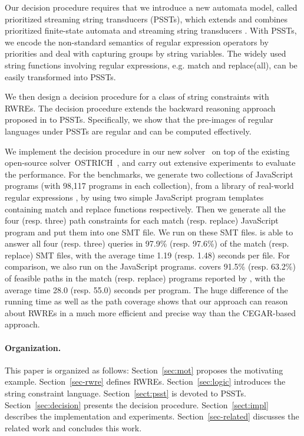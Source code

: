 Our decision procedure requires that we introduce a new automata model, called 
prioritized streaming string transducers (PSSTs), which extends and combines 
prioritized finite-state automata \cite{BM17} and streaming string transducers 
\cite{AC10,AD11}. With PSSTs, we encode the non-standard semantics of regular 
expression operators by priorities and deal with capturing groups by string variables. 
The widely used string functions involving regular expressions, e.g. match and replace(all), can be easily transformed into PSSTs. 

We then design a decision procedure for a class of string constraints with RWREs. The decision procedure extends the backward reasoning approach proposed in \cite{CHL+19} to PSSTs. Specifically, we show that the pre-images of regular languages under PSSTs are regular and can be computed effectively. 

We implement the decision procedure in our new solver \ostrich\  
on top of the existing open-source solver~OSTRICH~\cite{CHL+19},
 and carry out extensive experiments to evaluate the performance. For the benchmarks, we generate two collections of JavaScript programs (with 98,117 programs in each collection), from a library of real-world regular expressions \cite{DMC+19}, by using two simple JavaScript program templates containing match and replace functions respectively.  
 Then we generate all the four (resp. three) path constraints for each match (resp. replace) JavaScript program and put them into one SMT file. We run {\ostrich} on these SMT files. {\ostrich} is able to answer all four (resp. three) queries in 97.9\% (resp. 97.6\%) of the match (resp. replace) SMT files, with the average time 1.19 (resp. 1.48) seconds per file. For comparison, we also run \expose{} on the JavaScript programs. \expose{} covers 91.5\% (resp. 63.2\%) of feasible paths in the match (resp. replace) programs reported by {\ostrich}, with  the average time 28.0 (resp. 55.0) seconds per program. The huge difference of the running time as well as the path coverage shows that our approach can reason about RWREs in a much more efficient and precise way than the CEGAR-based approach. 


\paragraph*{Organization.} This paper is organized as follows: Section~\ref{sec:mot} proposes the motivating example. Section~\ref{sec-rwre} defines RWREs. Section~\ref{sec:logic} introduces the string constraint language. Section~\ref{sect:psst} is devoted to PSSTs. Section~\ref{sec:decision} presents the decision procedure. Section~\ref{sect:impl} describes the implementation and experiments. Section~\ref{sec-related} discusses the related work and concludes this work.

